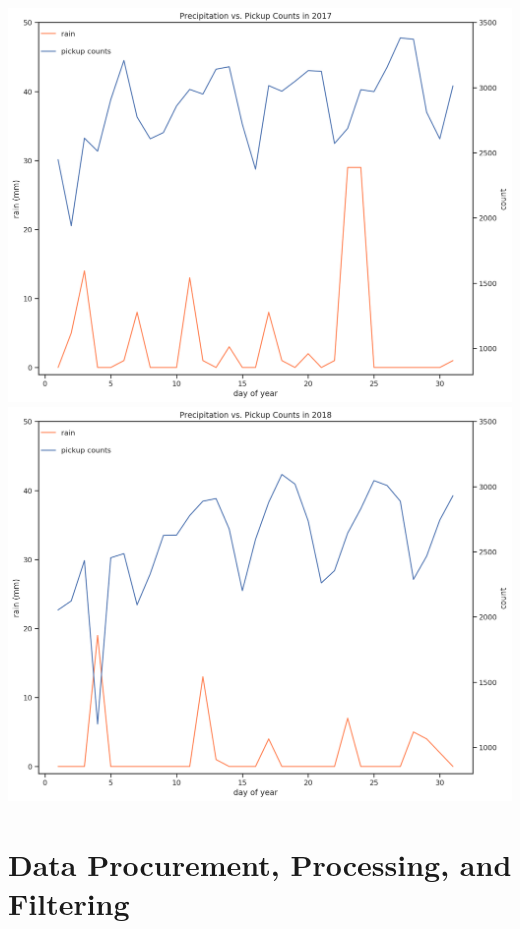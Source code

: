 \documentclass[journal]{IEEEtran}
\begin{document}
\begingroup
    \centering
    \includegraphics[width=\columnwidth]{report/images/2017_rain_count.png}
    \label{fig:2017_rain_count}
    \medskip
\endgroup
\begingroup
    \centering
    \includegraphics[width=\columnwidth]{report/images/2018_rain_count.png}
    \label{fig:2018_rain_count}
    \medskip
\endgroup


\section{Data Procurement, Processing, and Filtering}
\end{document}
